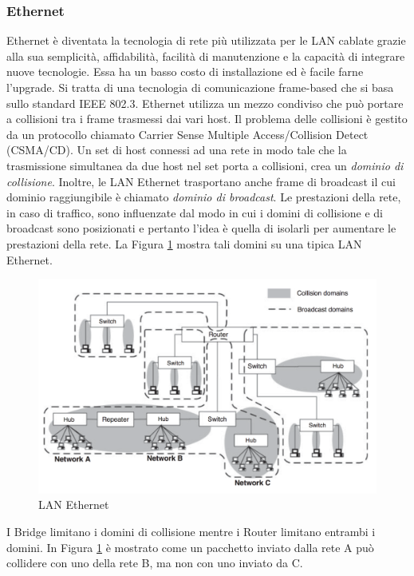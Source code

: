 \subsubsection{Ethernet}
Ethernet è diventata la tecnologia di rete più utilizzata per le LAN cablate grazie alla sua semplicità, affidabilità, facilità di manutenzione e la capacità di integrare nuove tecnologie. Essa ha un basso costo di installazione ed è facile farne l'upgrade. Si tratta di una tecnologia di comunicazione frame-based che si basa sullo standard IEEE 802.3. Ethernet utilizza un mezzo condiviso che può portare a collisioni tra i frame trasmessi dai vari host. Il problema delle collisioni è gestito da un protocollo chiamato Carrier Sense Multiple Access/Collision Detect (CSMA/CD). Un set di host connessi ad una rete in modo tale che la trasmissione simultanea da due host nel set porta a collisioni, crea un \emph{dominio di collisione}. Inoltre, le LAN Ethernet trasportano anche frame di broadcast il cui dominio raggiungibile è chiamato \emph{dominio di broadcast}. Le prestazioni della rete, in caso di traffico, sono influenzate dal modo in cui i domini di collisione e di broadcast sono posizionati e pertanto l'idea è quella di isolarli per aumentare le prestazioni della rete. La Figura \ref{fig:lan} mostra tali domini su una tipica LAN Ethernet.\newpage
\begin{figure}[h]
	\centering
	\includegraphics[scale=0.340]{imgs/lan.png}
	\caption{LAN Ethernet} \label{fig:lan}
\end{figure}
I Bridge limitano i domini di collisione mentre i Router limitano entrambi i domini. In Figura \ref{fig:lan} è mostrato come un pacchetto inviato dalla rete A può collidere con uno della rete B, ma non con uno inviato da C.
